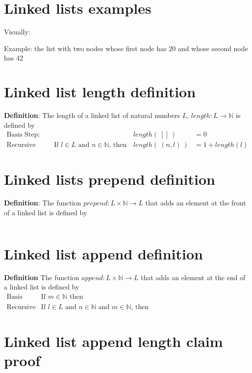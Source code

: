 \documentclass[12pt, oneside]{article}
\begin{document}
\section*{Linked lists examples}


Visually:

\vspace{50pt}

Example: the list with two nodes whose first node has $20$ and whose second node
has $42$

\vspace{50pt} \vfill
\section*{Linked list length definition}


{\bf Definition}: The length of a linked list of natural numbers $L$, $length: L \to \mathbb{N}$ is defined by
\[
\begin{array}{llll}
\textrm{Basis Step:} &  & length(~[]~) &= 0 \\
\textrm{Recursive Step:} & \textrm{If } l \in L\textrm{ and }n \in \mathbb{N}\textrm{, then  } & length(~(n, l)~)  &= 1+ length(l)
\end{array}
\]
 \vfill
\section*{Linked lists prepend definition}


{\bf Definition}: The function $prepend : L \times \mathbb{N} \to L$ that adds an element at the 
front of a linked list is defined by
\[
\phantom{prepend(~(l, n)~) = (n, l)}
\]
 \vfill
\section*{Linked list append definition}


{\bf Definition} The function $append : L \times \mathbb{N} \to L$ that 
adds an element at the end of a linked list is defined by
\[
\begin{array}{llll}
\textrm{Basis Step:} & \textrm{If } m \in \mathbb{N}\textrm{ then } & \phantom{append(~([], m)~)} & \phantom{= (m, []) }\\
\textrm{Recursive Step:} & \textrm{If } l \in L\textrm{ and }n \in \mathbb{N}\textrm{ and }m \in \mathbb{N}\textrm{, then  } & \phantom{append(~(~(n, l), m~)~) } &\phantom{= (n, append(~(l, m)~)~)}
\end{array}
\] \vfill
\section*{Linked list append length claim proof}
\end{document}
